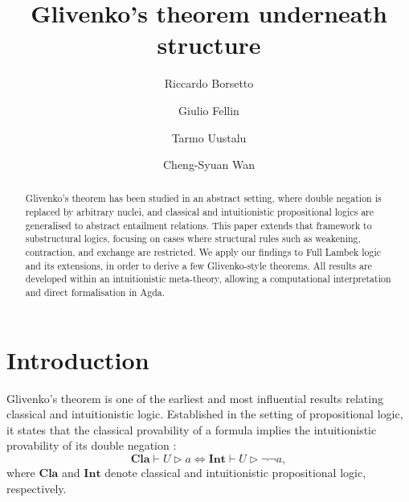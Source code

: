\documentclass[runningheads]{llncs}
\newcommand{\Cl}{\mathbf{Cla}}
\newcommand{\Int}{\mathbf{Int}}
\begin{document}
%
\title{Glivenko's theorem underneath structure}
%
%
\author{
    Riccardo Borsetto \and
    Giulio Fellin \and
    Tarmo Uustalu \and
    Cheng-Syuan Wan}
%
%
%
\maketitle              %
%
\begin{abstract}
    Glivenko's theorem has been studied in an abstract setting, where double negation is replaced by arbitrary nuclei, and classical and intuitionistic propositional logics are generalised to abstract entailment relations. This paper extends that framework to substructural logics, focusing on cases where structural rules such as weakening, contraction, and exchange are restricted. We apply our findings to Full Lambek logic and its extensions, in order to derive a few Glivenko-style theorems. All results are developed within an intuitionistic meta-theory, allowing a computational interpretation and direct formalisation in Agda.
    
\end{abstract}
%
%
%
\section{Introduction}

Glivenko's theorem is one of the earliest and most influential results relating classical and intuitionistic logic. Established in the setting of propositional logic, it states that the classical provability of a formula implies the intuitionistic provability of its double negation \cite{gliv28,gliv29}:
\[
\Cl \vdash U \rhd a \iff \Int \vdash U \rhd \neg\neg a,
\]
where $\Cl$ and $\Int$ denote classical and intuitionistic propositional logic, respectively.
\end{document}
